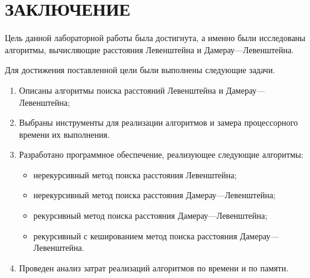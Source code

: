 \chapter*{ЗАКЛЮЧЕНИЕ}

Цель данной лабораторной работы была достигнута, а именно были исследованы алгоритмы, вычисляющие расстояния Левенштейна и Дамерау---Левенштейна.

Для достижения поставленной цели были выполнены следующие задачи.
\begin{enumerate}
	\item Описаны алгоритмы поиска расстояний Левенштейна и \newline Дамерау---Левенштейна;
	\item Выбраны инструменты для реализации алгоритмов и замера процессорного времени их выполнения.
	\item Разработано программное обеспечение, реализующее следующие алгоритмы:
	\begin{itemize}
		\item нерекурсивный метод поиска расстояния Левенштейна;
		\item нерекурсивный метод поиска расстояния Дамерау---Левенштейна;
		\item рекурсивный метод поиска расстояния Дамерау---Левенштейна;
		\item рекурсивный с кешированием метод поиска расстояния Дамерау---Левенштейна.
	\end{itemize}
	\item Проведен анализ затрат реализаций алгоритмов по времени и по памяти. 
\end{enumerate}